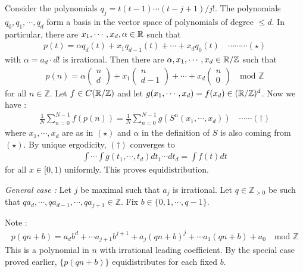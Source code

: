 \documentclass[10pt,a4paper]{report}
\newenvironment{proof}
{\begin{changemargin}{1cm}{0.5cm} 
	}%
	{\end{changemargin}
}
\begin{document}
\begin{proof}
\quad Consider the polynomials $q_j = t(t-1)\cdots (t-j+1)/j !$. The polynomials $q_0,q_1,\cdots,q_d$ form a basis in the vector space of polynomials of degree $\leq d$. In particular, there are $x_1, \cdots,x_d,\alpha \in \mathbb{R}$ such that
\begin{align*}
p(t) = \alpha q_d (t) + x_1 q_{d-1}(t) + \cdots + x_d q_0(t) \quad \cdots\cdots\cdots (\star)
\end{align*}
with $\alpha = a_d \cdot d!$ is irrational. Then there are $\alpha, x_1, \cdots,x_d \in \mathbb{R}/\mathbb{Z}$ such that
\begin{align*}
p(n) = \alpha\begin{pmatrix}
n \\
d
\end{pmatrix} + x_1 \begin{pmatrix}
n \\
d-1
\end{pmatrix} + \cdots + x_d \begin{pmatrix}
n \\
0
\end{pmatrix} \quad \text{mod } \mathbb{Z}
\end{align*}
for all $n\in \mathbb{Z}$. Let $f\in C(\mathbb{R}/\mathbb{Z})$ and let $g(x_1, \cdots, x_d) = f(x_d) \in (\mathbb{R}/\mathbb{Z})^d$. Now we have :
\begin{align*}
\frac{1}{N} \sum_{n=0}^{N-1} f(p(n)) = \frac{1}{N} \sum_{n=0}^{N-1} g(S^n(x_1, \cdots, x_d)) \quad \cdots \cdots (\dagger)
\end{align*}
where $x_1,\cdots, x_d$ are as in $(\star)$ and $\alpha$ in the definition of $S$ is also coming from $(\star)$. By unique ergodicity, $(\dagger)$ converges to
\begin{align*}
\int \cdots \int g(t_1, \cdots, t_d) dt_1 \cdots dt_d = \int f(t)dt 
\end{align*}
for all $x \in [0,1)$ uniformly. This proves equidistribution.
\s

\textit{General case :} Let $j$ be maximal such that $a_j$ is irrational. Let $q\in \mathbb{Z}_{>0}$ be such that $qa_d, \cdots,qa_{d-1},\cdots, qa_{j+1} \in \mathbb{Z}$. Fix $b \in \{ 0,1,\cdots,q-1 \}$.

\quad Note :
\begin{align*}
p(qn+b) = a_d b^d + \cdots a_{j+1} b^{j+1} + a_j(qn +b)^j + \cdots  a_1(qn+b) + a_0 \quad \text{mod } \mathbb{Z}
\end{align*}
This is a polynomial in $n$ with irrational leading coefficient. By the special case proved earlier, $\{ p(qn + b) \}$ equidistributes for each fixed $b$.

\eop
\end{proof}
\s
\end{document}
